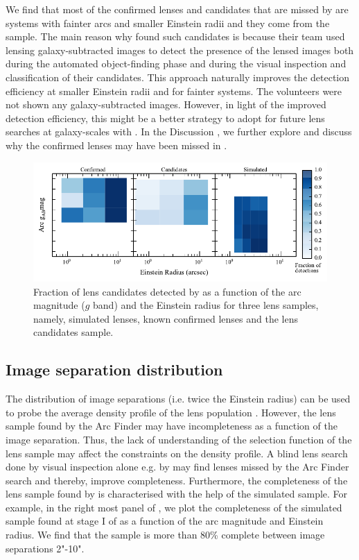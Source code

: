 \documentclass[useAMS,usenatbib,a4paper]{mn2e}
\begin{document}
We find that most of the confirmed lenses and candidates that are missed by \sw
are systems with fainter arcs and smaller Einstein radii and they come
from the \rf sample. The main reason why \rf found such
candidates is because their team used lensing
galaxy-subtracted images to detect the presence of the lensed images
both during the automated object-finding phase and during the visual
inspection and classification of their candidates. This approach
naturally improves the detection efficiency at smaller Einstein radii
and for fainter systems. The \sw volunteers were not shown any
galaxy-subtracted images. However, in light of the improved detection
efficiency, this might be a better strategy to adopt for future lens
searches at galaxy-scales with \sw. In the Discussion , we
further explore and discuss why the confirmed lenses may have been
missed in \sw. 

\begin{figure}
\begin{center}
\includegraphics[scale=1.0]{sw-cfhtls-figs/comp_reinst_mag.pdf}
\caption{ \label{fig:compre} Fraction of lens candidates detected by \sw
as a function of the arc magnitude ($g$ band) and the Einstein radius for
three lens samples, namely, simulated lenses, known confirmed lenses and
the lens candidates sample. }
\end{center}
\end{figure}


\subsection{Image separation distribution}
\label{sec:results:isd}

The distribution of image separations (i.e. twice the Einstein radius)
can be used to probe the average density profile of the lens population
\citep{Oguri2006,More2012}.  However, the lens sample found
by the Arc Finder may have incompleteness as a function of the image
separation. Thus, the lack of understanding of the selection function of
the lens sample may affect the constraints on the density profile.  A
blind lens search done by visual inspection alone e.g. by \sw may find
lenses missed by the Arc Finder search and thereby, improve
completeness. Furthermore, the completeness of the lens sample found by \sw is
characterised with the help of the simulated sample. For example, in the
right most panel of , we plot the completeness of the
simulated sample found at stage I of \sw as a function of the arc
magnitude and Einstein radius. We find that the sample is more than 80\%
complete between image separations 2"-10". 
\end{document}
